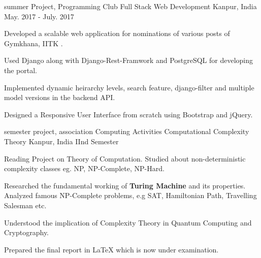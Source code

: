 


\begin{cventries}

 \cventry
    {summer Project, Programming Club}
    {Full Stack Web Development}
    {Kanpur, India}
    {May. 2017 - July. 2017}
    {
      \begin{cvitems}
          \item Developed a scalable web application for nominations of various posts of Gymkhana, IITK .
  \item Used Django along with Django-Rest-Framwork and PostgreSQL for developing the portal.  
  \item	Implemented dynamic heirarchy levels, search feature, django-filter and multiple model versions in the backend API.
  \item Designed a Responsive User Interface from scratch using Bootstrap and jQuery.
      \end{cvitems}
    }

 \cventry
    {semester project, association Computing Activities}
    {Computational Complexity Theory}
    {Kanpur, India}
    {IInd Semester}
    {
      \begin{cvitems}
         \item Reading Project on Theory of Computation. Studied about non-deterministic complexity classes eg. NP, NP-Complete, NP-Hard.
  \item Researched the fundamental working of \textbf{Turing Machine} and its properties. Analyzed famous NP-Complete problems, e.g SAT, Hamiltonian Path, Travelling Salesman etc. 
  \item Understood the implication of Complexity Theory in Quantum Computing and Cryptography.
  \item Prepared the final report in \LaTeX{} which is now under examination. 
      \end{cvitems}
    }

\end{cventries}

